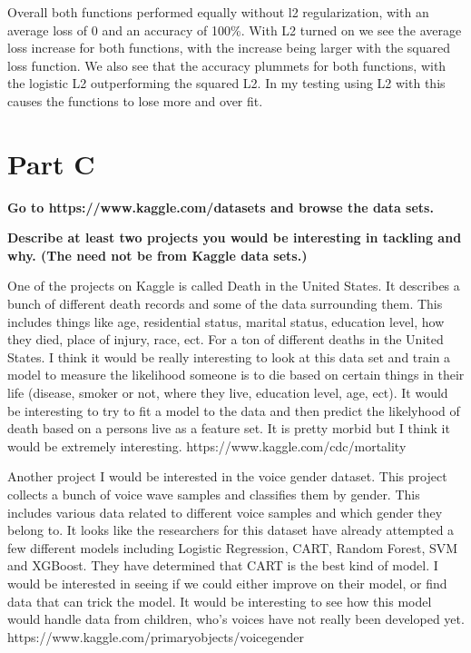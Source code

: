 \documentclass[11pt, oneside]{article}   	%
\begin{document}
Overall both functions performed equally without l2 regularization, with an average loss of 0 and an accuracy of 100\%. With L2 turned on we see the average loss increase for both functions, with the increase being larger with the squared loss function. We also see that the accuracy plummets for both functions, with the logistic L2 outperforming the squared L2. In my testing using L2 with this causes the functions to lose more and over fit. 

\section*{Part C}

\textbf{Go to https://www.kaggle.com/datasets and browse the data sets.}

\textbf{Describe at least two projects you would be interesting in tackling and why. (The need not be from Kaggle data sets.)}

One of the projects on Kaggle is called Death in the United States. It describes a bunch of different death records and some of the data surrounding them. This includes things like age, residential status, marital status, education level, how they died, place of injury, race, ect. For a ton of different deaths in the United States. I think it would be really interesting to look at this data set and train a model to measure the likelihood someone is to die based on certain things in their life (disease, smoker or not, where they live, education level, age, ect). It would be interesting to try to fit a model to the data and then predict the likelyhood of death based on a persons live as a feature set. It is pretty morbid but I think it would be extremely interesting. 
https://www.kaggle.com/cdc/mortality

Another project I would be interested in the voice gender dataset. This project collects a bunch of voice wave samples and classifies them by gender. This includes various data related to different voice samples and which gender they belong to. It looks like the researchers for this dataset have already attempted a few different models including Logistic Regression, CART, Random Forest, SVM and XGBoost. They have determined that CART is the best kind of model. I would be interested in seeing if we could either improve on their model, or find data that can trick the model. It would be interesting to see how this model would handle data from children, who's voices have not really been developed yet. https://www.kaggle.com/primaryobjects/voicegender
\end{document}
